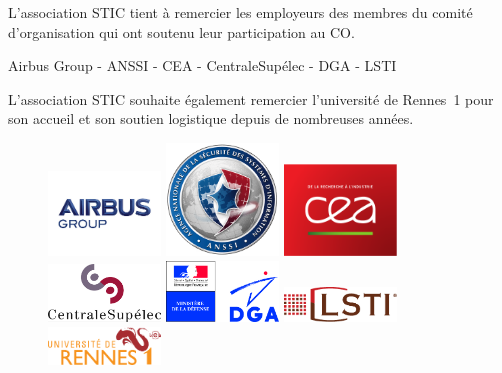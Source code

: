 \noindent
L'association STIC tient à remercier les employeurs des membres du
comité d'organisation qui ont soutenu leur participation au CO.

\begin{center}
Airbus Group - ANSSI -  CEA - CentraleSup\'elec - DGA - LSTI
\end{center}

\bigskip

\noindent
L'association STIC souhaite également remercier l'université de
Rennes~1 pour son accueil et son soutien logistique depuis de
nombreuses années.


\begin{figure}[h]
\begin{center}
\parbox{3cm}{\includegraphics[width=3cm]{_images/airbus}}
\hfill
\parbox{3cm}{\includegraphics[width=3cm]{_images/anssi}}
\hfill
\parbox{3cm}{\includegraphics[width=3cm]{_images/cea}}
\end{center}
\vfill
\begin{center}
\parbox{3cm}{\includegraphics[width=3cm]{_images/centrale-supelec}}
\hfill
\parbox{3cm}{\includegraphics[width=3cm]{_images/dga}}
\hfill
\parbox{3cm}{\includegraphics[width=3cm]{_images/lsti}}
\end{center}
\vfill
\begin{center}
\parbox{3cm}{\includegraphics[width=3cm]{_images/uni-rennes1}}
\end{center}
\end{figure}


